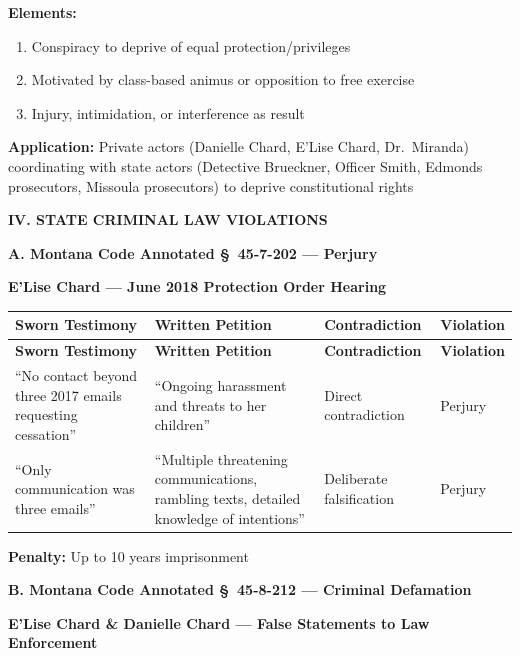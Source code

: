 \documentclass[11pt, letterpaper]{article}
\newcommand{\sectiontitle}[1]{\vspace{0.2in}\noindent\textcolor{NavyBlue}{\large\textbf{#1}}\vspace{0.1in}}
\newcommand{\subsectiontitle}[1]{\vspace{0.15in}\noindent\textcolor{NavyBlue}{\textbf{#1}}\vspace{0.05in}}
\begin{document}
\textbf{Elements:}
\begin{enumerate}[leftmargin=*,itemsep=2pt]
    \item Conspiracy to deprive of equal protection/privileges
    \item Motivated by class-based animus or opposition to free exercise
    \item Injury, intimidation, or interference as result
\end{enumerate}

\textbf{Application:} Private actors (Danielle Chard, E'Lise Chard, Dr.\ Miranda) coordinating with state actors (Detective Brueckner, Officer Smith, Edmonds prosecutors, Missoula prosecutors) to deprive constitutional rights

\sectiontitle{IV. STATE CRIMINAL LAW VIOLATIONS}

\subsectiontitle{A. Montana Code Annotated \S\ 45-7-202 --- Perjury}

\textbf{E'Lise Chard --- June 2018 Protection Order Hearing}

\begin{center}
\begin{longtable}{|p{1.3in}|p{1.5in}|p{1.3in}|p{1.0in}|}
\hline
\textbf{Sworn Testimony} & \textbf{Written Petition} & \textbf{Contradiction} & \textbf{Violation} \\
\hline
\endfirsthead
\hline
\textbf{Sworn Testimony} & \textbf{Written Petition} & \textbf{Contradiction} & \textbf{Violation} \\
\hline
\endhead
``No contact beyond three 2017 emails requesting cessation'' & ``Ongoing harassment and threats to her children'' & Direct contradiction & Perjury \\
\hline
``Only communication was three emails'' & ``Multiple threatening communications, rambling texts, detailed knowledge of intentions'' & Deliberate falsification & Perjury \\
\hline
\end{longtable}
\end{center}

\textbf{Penalty:} Up to 10 years imprisonment

\subsectiontitle{B. Montana Code Annotated \S\ 45-8-212 --- Criminal Defamation}

\textbf{E'Lise Chard \& Danielle Chard --- False Statements to Law Enforcement}
\end{document}
